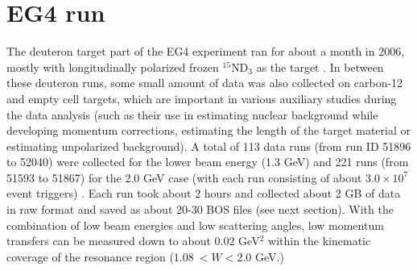 \chapter{EG4 run}
\label{cha:EG4}

The deuteron target part of the EG4 experiment ran for about a month in 2006, mostly with %
longitudinally polarized frozen $^{15}$ND$_3$ as the target%
. In between these deuteron runs, some small amount of data was %
also collected on carbon-12 and empty cell targets, which are important in various auxiliary studies during the data analysis (such as their use in estimating nuclear background while developing momentum corrections, estimating the length %
of the target material %
 or estimating unpolarized background). %
 A total of 113 data runs (from run ID 51896 to 52040) were collected for the lower beam energy (1.3 GeV) and 221 runs (from 51593 to 51867) for the 2.0 GeV case (with each run consisting of %
 about $3.0\times 10^7$ event triggers) \cite{eg4wiki}. %
Each run took about 2 hours and collected about 2 GB of data in %
raw format and saved as about 20-30 BOS files (see next section). With the combination of low %
beam energies and low scattering angles, %
low momentum transfers can be measured down to about 0.02 GeV$^2$ %
within the kinematic coverage of the resonance region ($1.08 ~ < W <2.0$ GeV.) %



